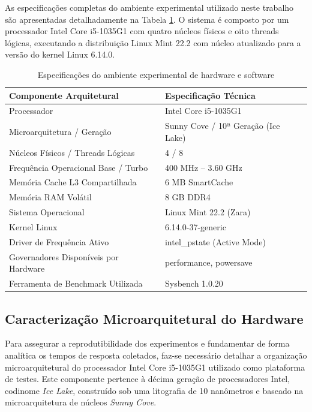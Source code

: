 \documentclass[12pt]{article}
\begin{document}
As especificações completas do ambiente experimental utilizado neste trabalho são apresentadas detalhadamente na Tabela \ref{tab:ambiente}. O sistema é composto por um processador Intel Core i5-1035G1 com quatro núcleos físicos e oito threads lógicas, executando a distribuição Linux Mint 22.2 com núcleo atualizado para a versão do kernel Linux 6.14.0.

\begin{table}[ht]
\centering
\caption{Especificações do ambiente experimental de hardware e software}
\label{tab:ambiente}
\begin{tabular}{|l|l|}
\hline
\textbf{Componente Arquitetural} & \textbf{Especificação Técnica} \\
\hline
Processador & Intel Core i5-1035G1 \\
\hline
Microarquitetura / Geração & Sunny Cove / 10ª Geração (Ice Lake) \\
\hline
Núcleos Físicos / Threads Lógicas & 4 / 8 \\
\hline
Frequência Operacional Base / Turbo & 400 MHz -- 3.60 GHz \\
\hline
Memória Cache L3 Compartilhada & 6 MB SmartCache \\
\hline
Memória RAM Volátil & 8 GB DDR4 \\
\hline
Sistema Operacional & Linux Mint 22.2 (Zara) \\
\hline
Kernel Linux & 6.14.0-37-generic \\
\hline
Driver de Frequência Ativo & intel\_pstate (Active Mode) \\
\hline
Governadores Disponíveis por Hardware & performance, powersave \\
\hline
Ferramenta de Benchmark Utilizada & Sysbench 1.0.20 \\
\hline
\end{tabular}
\end{table}

\subsection{Caracterização Microarquitetural do Hardware}

Para assegurar a reprodutibilidade dos experimentos e fundamentar de forma analítica os tempos de resposta coletados, faz-se necessário detalhar a organização microarquitetural do processador Intel Core i5-1035G1 utilizado como plataforma de testes. Este componente pertence à décima geração de processadores Intel, codinome \textit{Ice Lake}, construído sob uma litografia de 10 nanômetros e baseado na microarquitetura de núcleos \textit{Sunny Cove}. 
\end{document}

